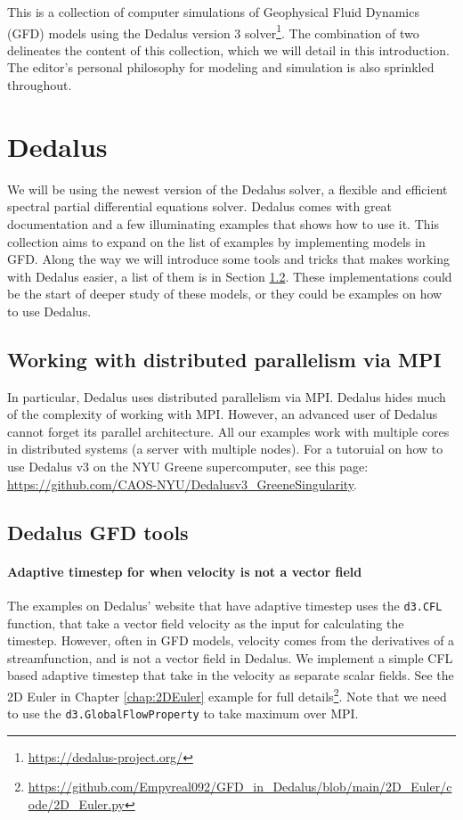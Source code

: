 This is a collection of computer simulations of Geophysical Fluid Dynamics (GFD) models using the Dedalus version 3 solver\footnote{\url{https://dedalus-project.org/}}. The combination of two delineates the content of this collection, which we will detail in this introduction. The editor's personal philosophy for modeling and simulation is also sprinkled throughout. 

\section{Dedalus}
We will be using the newest version of the Dedalus solver, a flexible and efficient spectral partial differential equations solver. Dedalus comes with great documentation and a few illuminating examples that shows how to use it. This collection aims to expand on the list of examples by implementing models in GFD. Along the way we will introduce some tools and tricks that makes working with Dedalus easier, a list of them is in Section \ref{sec:Ded_tools}. These implementations could be the start of deeper study of these models, or they could be examples on how to use Dedalus. 

\subsection{Working with distributed parallelism via MPI}
In particular, Dedalus uses distributed parallelism via MPI. Dedalus hides much of the complexity of working with MPI. However, an advanced user of Dedalus cannot forget its parallel architecture. All our examples work with multiple cores in distributed systems (a server with multiple nodes). For a tutoruial on how to use Dedalus v3 on the NYU Greene supercomputer, see this page: \url{https://github.com/CAOS-NYU/Dedalusv3_GreeneSingularity}.

\subsection{Dedalus GFD tools}\label{sec:Ded_tools}
\paragraph{Adaptive timestep for when velocity is not a vector field}
The examples on Dedalus' website that have adaptive timestep uses the \texttt{d3.CFL} function, that take a vector field velocity as the input for calculating the timestep. However, often in GFD models, velocity comes from the derivatives of a streamfunction, and is not a vector field in Dedalus. We implement a simple CFL based adaptive timestep that take in the velocity as separate scalar fields. See the 2D Euler in Chapter \ref{chap:2DEuler} example for full details\footnote{\url{https://github.com/Empyreal092/GFD_in_Dedalus/blob/main/2D_Euler/code/2D_Euler.py}}. Note that we need to use the \texttt{d3.GlobalFlowProperty} to take maximum over MPI.

